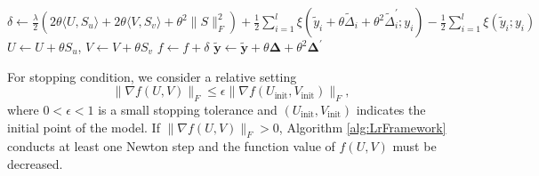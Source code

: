 \documentclass[11pt,twoside]{article}
\newcommand{\bsym}[1]{\ensuremath{\boldsymbol{#1}}}
\begin{document}
\begin{algorithm}
\begin{algorithmic}[1]
                \State $\delta \gets \frac{\lambda}{2}\left( 2\theta \langle U, S_u \rangle + 2\theta \langle V, S_v \rangle + \theta^2\|S\|_F^2 \right) + \frac{1}{2} \sum_{i=1}^l \xi(\tilde{y}_i+\theta\tilde{\Delta}_i+{\theta}^2\tilde{\Delta}_i^\prime;y_i) - \frac{1}{2}\sum_{i=1}^l \xi(\tilde{y}_i;y_i)$
                    \State $U \gets U +\theta S_u$, $V \gets V +\theta S_v$
                    \State $f \gets f+ \delta$
                    \State $\bsym{\tilde{y}} \gets \bsym{\tilde{y}}+\theta\bsym{{\Delta}} +{\theta}^2 \bsym{{\Delta}}^\prime$
                \EndIf
            \EndFor
        \EndFor
    \end{algorithmic}
\end{algorithm}

For stopping condition, we consider a relative setting
\begin{equation}
    \|\nabla f(U,V)\|_F \le \epsilon \|\nabla f(U_{\text{init}},V_{\text{init}})\|_F,
    \label{eq:AntStop}
\end{equation}
where $0<\epsilon<1$ is a small stopping tolerance and $(U_{\text{init}},V_{\text{init}})$ indicates the initial point of the model. 
If $\|\nabla f(U,V)\|_F >0$, Algorithm \ref{alg:LrFramework} conducts at least one Newton step and the function value of $f(U,V)$ must be decreased. %
\end{document}
